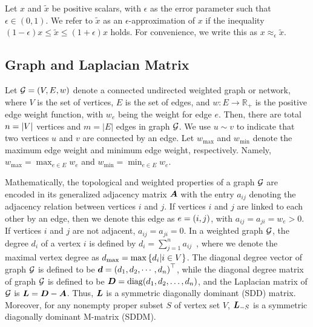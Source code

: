 \documentclass[10pt,twocolumn,twoside]{IEEEtran}
\begin{document}



\begin{definition}
    Let \(x\) and \(\tilde{x}\) be positive scalars, with \(\epsilon\) as the error parameter such that \(\epsilon\in(0,1)\). We refer to \(\tilde{x}\) as an \(\epsilon\)-approximation of \(x\) if the inequality \((1-\epsilon)x\le \tilde{x}\le(1+\epsilon)x\) holds. For convenience, we write this as \(x\approx_{\epsilon}\tilde{x}\).
\end{definition}



\subsection{Graph and Laplacian Matrix}\label{sub:lap}

Let \(\mathcal{G}=(V,E,w)\) denote a connected undirected weighted graph or network,  where \(V\) is the set of vertices,  \(E\) is the set of edges, and  \(w: E\to \mathbb{R}_{+}\) is the positive edge weight function, with \(w_e\) being the weight for edge \(e\). Then, there are total \(n=\left|V \right|\) vertices and \(m=|E|\) edges in graph \(\mathcal{G}\). We use \(u \sim v\) to indicate that two vertices \(u\) and \(v\) are connected by an edge. Let \(w_{\max}\) and \(w_{\min}\) denote the maximum edge weight and minimum edge weight, respectively. Namely, \(w_{\max}=\max_{e\in E} w_e \) and \(w_{\min}=\min_{e\in E} w_e\).

Mathematically, the topological and weighted properties of a graph \(\mathcal{G}\) are encoded in its generalized adjacency matrix \(\boldsymbol{A}\) with the entry \(a_{ij}\) denoting the adjacency relation between vertices \(i\) and \(j\). If vertices \(i\) and \(j\) are linked to each other by an edge, then we denote this edge as \(e=\left( i,j \right)\), with \(a_{ij}= a_{ji}=w_{e}> 0\). If vertices \(i\) and \(j\) are not adjacent, \(a_{ij}=a_{ji}=0\). In a weighted graph \(\mathcal{G}\), the degree \(d_i\) of a vertex \(i\) is defined by \(d_i=\sum_{j=1}^n a_{ij}\)~\cite{BaBaPaVe04}, where we denote the maximal vertex degree as \(d_{\max}=\max\left\{d_i|i\in V \right\}\).
The diagonal degree vector of graph \(\mathcal{G}\) is defined to be \(\boldsymbol{d}=\left( d_1,d_2,\cdots,d_n \right)^\top\), while the diagonal degree matrix of graph \(\mathcal{G}\) is defined to be \({\boldsymbol{D}} = {\rm diag}(d_1, d_2, \ldots, d_n)\), and the Laplacian matrix of \(\mathcal{G}\) is \({\boldsymbol{L}}={\boldsymbol{D}}-{\boldsymbol{A}}\). Thus, \(\boldsymbol{L}\)  is a symmetric diagonally dominant (SDD) matrix. Moreover, for
any  nonempty  proper subset  \(S \) of vertex set $V$, \(\boldsymbol{L}_{-S}\) is a symmetric diagonally dominant M-matrix (SDDM).
\end{document}
